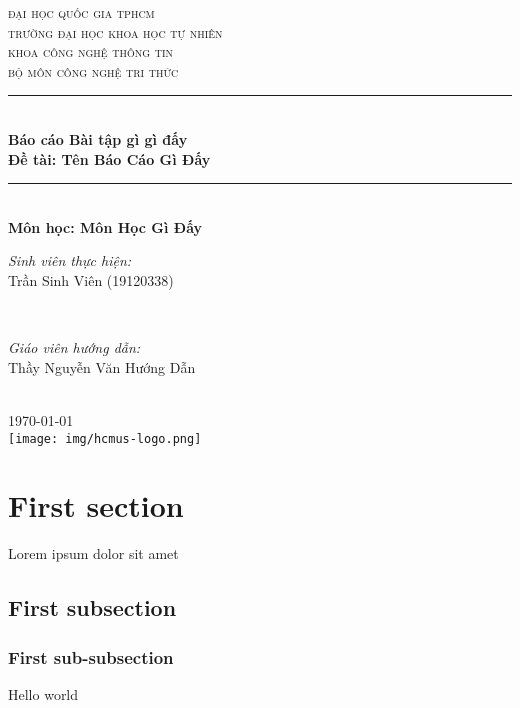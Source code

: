 \documentclass[12pt]{article}
\newcommand{\coursename}{Môn Học Gì Đấy}
\newcommand{\reportname}{Tên Báo Cáo Gì Đấy}
\begin{document}
\begin{titlepage}
\newcommand{\HRule}{\rule{\linewidth}{0.5mm}}
\centering

\textsc{\LARGE đại học quốc gia tphcm}\\[1.5cm]
\textsc{\Large trường đại học khoa học tự nhiên}\\[0.5cm]
\textsc{\large khoa công nghệ thông tin}\\[0.5cm]
\textsc{bộ môn công nghệ tri thức}\\[0.5cm]

\HRule \\[0.4cm]
{ 
\huge{\bfseries{Báo cáo Bài tập gì gì đấy}}\\[0.5cm]
\large{\bfseries{Đề tài: \reportname}}
}\\[0.4cm]
\HRule \\[0.5cm]

\textbf{\large Môn học: \coursename}\\[0.5cm]

\begin{minipage}[t]{0.4\textwidth}
\begin{flushleft} \large
\emph{Sinh viên thực hiện:}\\
Trần Sinh Viên (19120338)
\end{flushleft}
\end{minipage}
~
\begin{minipage}[t]{0.4\textwidth}
\begin{flushright} \large
\emph{Giáo viên hướng dẫn:} \\
Thầy Nguyễn Văn Hướng Dẫn
\end{flushright}
\end{minipage}\\[2cm]

{\large \today}\\[2cm]

\texttt{[image: img/hcmus-logo.png]}\\[1cm] 

\vfill
\end{titlepage}
	
	
\tableofcontents
\pagebreak

\section{First section}
Lorem ipsum dolor sit amet\cite{greenwade93}

\subsection{First subsection}
\subsubsection{First sub-subsection}
Hello world

\cleardoublepage
{}
{}


\end{document}

